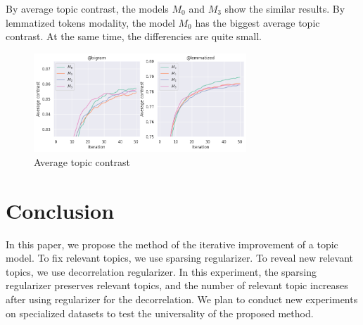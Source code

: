 \documentclass{article}
\begin{document}
By average topic contrast, the models $M_0$ and $M_3$ show the similar results.
By lemmatized tokens modality, the model $M_0$ has the biggest average topic contrast.
At the same time, the differencies are quite small.

\begin{figure}[h]
\includegraphics[width=8cm]
{figures/avg_contrast_v3.png}
\centering
\caption{Average topic contrast}
\end{figure}

\section{Conclusion}

In this paper, we propose the method of the iterative improvement of a topic model. To fix relevant topics, we use sparsing regularizer. To reveal new relevant topics, we use decorrelation regularizer.
In this experiment, the sparsing regularizer preserves relevant topics, and the number of relevant topic increases after using regularizer for the decorrelation.
We plan to conduct new experiments on specialized datasets to test the universality of the proposed method.


\renewcommand{\refname}{References} 

\end{document}
